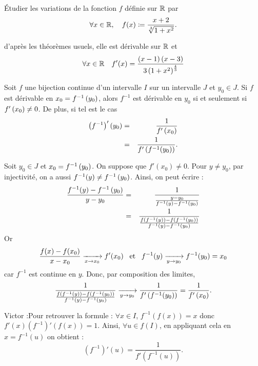 \documentclass{magnoliaold}
\begin{document}
\begin{exoUnique}
\exo Étudier les variations de la fonction $f$ définie sur $\mathbb{R}$ par
  \[\forall x\in\mathbb{R} ,\quad f(x)\coloneqq\frac{x+2}{\sqrt[3]{1+x^2}}.\]
  \begin{sol}
  d'après les théorèmes usuels, elle est dérivable sur $\mathbb{R}$ et
  \[\forall x\in\mathbb{R} \quad f'(x)=
    \frac{\left(x-1\right)\left(x-3\right)}{3\left(1+x^2\right)^{\frac{4}{3}}}\]    
  \end{sol}
\end{exoUnique}

\begin{proposition}[utile=-3]
Soit $f$ une bijection continue d'un intervalle $I$ sur un intervalle $J$ et
$y_0\in J$. Si $f$ est dérivable en $x_0=f^{-1}\left(y_0\right)$, alors $f^{-1}$
est dérivable en $y_0$ si et seulement si $f'\left(x_0\right)\neq 0$. De plus, si tel
est le cas
\begin{eqnarray*}
\left(f^{-1}\right)'\left(y_0\right)&=&\frac{1}{f'\left(x_0\right)}\\
&=&\frac{1}{f'\left(f^{-1}(y_0)\right)}.
\end{eqnarray*}
\end{proposition}

\begin{preuve}
Soit $y_0\in J$ et $x_0=f^{-1}\left(y_0\right)$. On suppose que $f'(x_0)\neq 0$.
Pour $y\neq y_0$, par injectivité, on a aussi $f^{-1}(y)\neq f^{-1}\left(y_0\right)$. Ainsi, on peut écrire :
\begin{eqnarray*}
\frac{f^{-1}(y)-f^{-1}\left(y_0\right)}{y-y_0}&=&\frac{1}{\frac{y-y_0}{f^{-1}(y)-f^{-1}\left(y_0\right)}}\\
&=&\frac{1}{\frac{f(f^{-1}(y))-f(f^{-1}(y_0))}{f^{-1}(y)-f^{-1}\left(y_0\right)}}
\end{eqnarray*}
Or $$\frac{f(x)-f(x_0)}{x-x_0}\xrightarrow[x\rightarrow x_0]{}f'(x_0) \quad\!\text{et}\quad\! f^{-1}(y)\xrightarrow[y\rightarrow y_0]{}f^{-1}(y_0)=x_0$$ car $f^{-1}$ est continue en $y$. Donc, par composition des limites, $$\frac{1}{\frac{f(f^{-1}(y))-f(f^{-1}(y_0))}{f^{-1}(y)-f^{-1}\left(y_0\right)}}\xrightarrow[y\rightarrow y_0]{}\frac{1}{f'\left(f^{-1}(y_0)\right)}=\frac{1}{f'\left(x_0\right)}.$$
\begin{victor}
Victor :Pour retrouver la formule : $\forall x \in I$, $f^{-1}(f(x))=x$ donc $f'(x)(f^{-1})'(f(x))=1$. Ainsi, $\forall u \in f(I)$, en appliquant cela en $x=f^{-1}(u)$ on obtient :
\[(f^{-1})'(u)=\frac{1}{f'(f^{-1}(u))}.\]
\end{victor}

\end{preuve}

\end{document}
